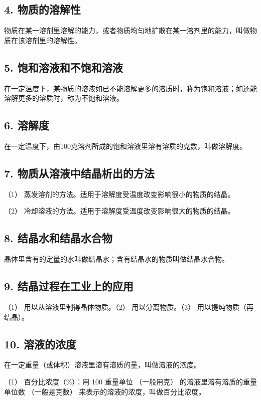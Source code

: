 \subsection{4. 物质的溶解性}

物质在某一溶剂里溶解的能力，或者物质均匀地扩散在某一溶剂里的能力，叫做物质在该溶剂里的溶解性。

\subsection{5. 饱和溶液和不饱和溶液}

在一定温度下，某物质的溶液如已不能溶解更多的溶质时，称为饱和溶液；如还能溶解更多的溶质时，称为不饱和溶液。

\subsection{6. 溶解度}

在一定温度下，由100克溶剂所成的饱和溶液里溶有溶质的克数，叫做溶解度。

\subsection{7. 物质从溶液中结晶析出的方法}

（1） 蒸发溶剂的方法。适用于溶解度受温度改变影响很小的物质的结晶。

（2） 冷却溶液的方法。适用于溶解度受温度改变影响很大的物质的结晶。

\subsection{8. 结晶水和结晶水合物}

晶体里含有的定量的水叫做结晶水；含有结晶水的物质叫做结晶水合物。

\subsection{9. 结晶过程在工业上的应用}

（1） 用以从溶液里制得晶体物质。（2） 用以分离物质。（3）
用以提纯物质（再结晶）。

\subsection{10. 溶液的浓度}

在一定重量（或体积）溶液里溶有溶质的量，叫做溶液的浓度。

（1） 百分比浓度（\%）：用 100 重量单位 （一般用克）
的溶液里溶有溶质的重量单位数 （一般是克数）
来表示的溶液的浓度，叫做百分比浓度。

